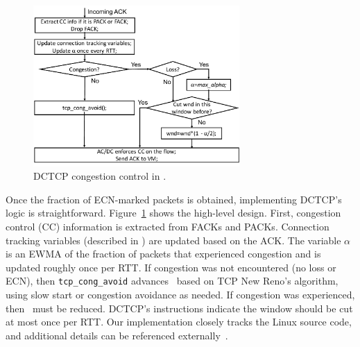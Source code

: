 \begin{figure}[!t]
        \centering
  \includegraphics[width=0.7\textwidth]{acdctcp/figures/acdc_cc.pdf}
        \caption{DCTCP congestion control in \acdc{}.}
        \label{acdc_cc}
\end{figure}
Once the fraction of ECN-marked packets is obtained, implementing DCTCP's logic is straightforward.
Figure~\ref{acdc_cc} shows the high-level design. 
First, congestion control (CC) information is extracted from FACKs and PACKs. Connection tracking
variables (described in ) are updated based on the ACK. The variable
$\alpha$ is an EWMA of the fraction of packets that experienced congestion and is updated roughly
once per RTT. If congestion was not encountered (no loss or ECN), then {\tt tcp\_cong\_avoid} advances~\cwnd{}
based on TCP New Reno's algorithm, using slow start or congestion avoidance as needed. If congestion was
experienced, then~\cwnd{} must be reduced. DCTCP's instructions indicate the window should
be cut at most once per RTT.
Our implementation closely tracks the Linux source code, and
additional details can be referenced externally~\cite{alizadeh2011data,ietf-tcpm-dctcp}.


